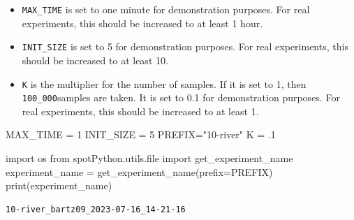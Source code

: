 \documentclass[
  letterpaper,
  DIV=11,
  numbers=noendperiod]{scrreprt}
\newenvironment{Shaded}{\begin{snugshade}}{\end{snugshade}}
\newcommand{\BuiltInTok}[1]{\textcolor[rgb]{0.00,0.23,0.31}{#1}}
\newcommand{\DecValTok}[1]{\textcolor[rgb]{0.68,0.00,0.00}{#1}}
\newcommand{\FloatTok}[1]{\textcolor[rgb]{0.68,0.00,0.00}{#1}}
\newcommand{\ImportTok}[1]{\textcolor[rgb]{0.00,0.46,0.62}{#1}}
\newcommand{\NormalTok}[1]{\textcolor[rgb]{0.00,0.23,0.31}{#1}}
\newcommand{\OperatorTok}[1]{\textcolor[rgb]{0.37,0.37,0.37}{#1}}
\newcommand{\StringTok}[1]{\textcolor[rgb]{0.13,0.47,0.30}{#1}}
\providecommand{\tightlist}{%
  \setlength{\itemsep}{0pt}\setlength{\parskip}{0pt}}\usepackage{longtable,booktabs,array}
\begin{document}
\begin{tcolorbox}[enhanced jigsaw, titlerule=0mm, colbacktitle=quarto-callout-caution-color!10!white, coltitle=black, arc=.35mm, toptitle=1mm, colback=white, left=2mm, opacityback=0, bottomtitle=1mm, bottomrule=.15mm, breakable, opacitybacktitle=0.6, colframe=quarto-callout-caution-color-frame, rightrule=.15mm, toprule=.15mm, leftrule=.75mm, title=\textcolor{quarto-callout-caution-color}{\faFire}\hspace{0.5em}{Caution: Run time and initial design size should be increased for real
experiments}]

\begin{itemize}
\tightlist
\item
  \texttt{MAX\_TIME} is set to one minute for demonstration purposes.
  For real experiments, this should be increased to at least 1 hour.
\item
  \texttt{INIT\_SIZE} is set to 5 for demonstration purposes. For real
  experiments, this should be increased to at least 10.
\item
  \texttt{K} is the multiplier for the number of samples. If it is set
  to 1, then \texttt{100\_000}samples are taken. It is set to 0.1 for
  demonstration purposes. For real experiments, this should be increased
  to at least 1.
\end{itemize}

\end{tcolorbox}

\begin{Shaded}
\begin{Highlighting}[]
\NormalTok{MAX\_TIME }\OperatorTok{=} \DecValTok{1}
\NormalTok{INIT\_SIZE }\OperatorTok{=} \DecValTok{5}
\NormalTok{PREFIX}\OperatorTok{=}\StringTok{"10{-}river"}
\NormalTok{K }\OperatorTok{=} \FloatTok{.1}
\end{Highlighting}
\end{Shaded}

\begin{Shaded}
\begin{Highlighting}[]
\ImportTok{import}\NormalTok{ os}
\ImportTok{from}\NormalTok{ spotPython.utils.}\BuiltInTok{file} \ImportTok{import}\NormalTok{ get\_experiment\_name}
\NormalTok{experiment\_name }\OperatorTok{=}\NormalTok{ get\_experiment\_name(prefix}\OperatorTok{=}\NormalTok{PREFIX)}
\BuiltInTok{print}\NormalTok{(experiment\_name)}
\end{Highlighting}
\end{Shaded}

\begin{verbatim}
10-river_bartz09_2023-07-16_14-21-16
\end{verbatim}
\end{document}
